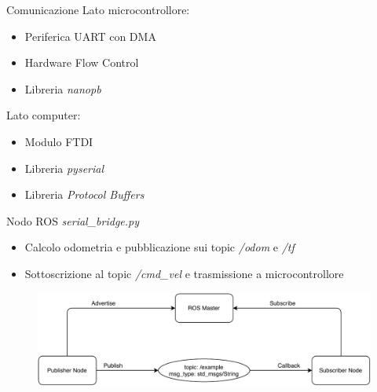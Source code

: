\documentclass{beamer}
\begin{document}
\begin{tframe}{Comunicazione}
Lato microcontrollore:
\begin{itemize}
    \item Periferica UART con DMA
    \item Hardware Flow Control
    \item Libreria \textit{nanopb}
\end{itemize}
Lato computer:
\begin{itemize}
    \item Modulo FTDI
    \item Libreria \textit{pyserial}
    \item Libreria \textit{Protocol Buffers}
\end{itemize}
\end{tframe}

\begin{tframe}{Nodo ROS \textit{serial\_bridge.py}}
\begin{itemize}
    \item Calcolo odometria e pubblicazione sui topic \textit{/odom} e \textit{/tf}
    \item Sottoscrizione al topic \textit{/cmd\_vel} e trasmissione a microcontrollore
\end{itemize}
\begin{figure}
         \centering
         \includegraphics[width=\columnwidth]{img/ros_system.pdf}
    \end{figure}
\end{tframe}
\end{document}
